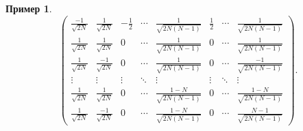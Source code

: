 \documentclass[a4paper]{article}
\newtheorem{example}{Пример}
\begin{document}
\begin{example}
\[\begin{pmatrix}
             \frac{-1}{\sqrt{2N}} & \frac{1}{\sqrt{2N}}  & -\frac12 & \cdots & \frac{1}{\sqrt{2N(N-1)}}   & \frac12  & \cdots & \frac{1}{\sqrt{2N(N-1)}} \\
             \frac{1}{\sqrt{2N}}  & \frac{1}{\sqrt{2N}}  & 0        & \cdots & \frac{1}{\sqrt{2N(N-1)}}   & 0        & \cdots & \frac{1}{\sqrt{2N(N-1)}} \\
             \frac{1}{\sqrt{2N}}  & \frac{-1}{\sqrt{2N}} & 0        & \cdots & \frac{1}{\sqrt{2N(N-1)}}   & 0        & \cdots & \frac{-1}{\sqrt{2N(N-1)}} \\
             \vdots               & \vdots               & \vdots   & \ddots & \vdots                     & \vdots   & \ddots & \vdots \\
             \frac{1}{\sqrt{2N}}  & \frac{1}{\sqrt{2N}}  & 0        & \cdots & \frac{1-N}{\sqrt{2N(N-1)}} & 0        & \cdots & \frac{1-N}{\sqrt{2N(N-1)}} \\
             \frac{1}{\sqrt{2N}}  & \frac{-1}{\sqrt{2N}} & 0        & \cdots & \frac{1-N}{\sqrt{2N(N-1)}} & 0        & \cdots & \frac{N-1}{\sqrt{2N(N-1)}}
         \end{pmatrix}. \]
 \end{example}

 \printbibliography
\end{document}
